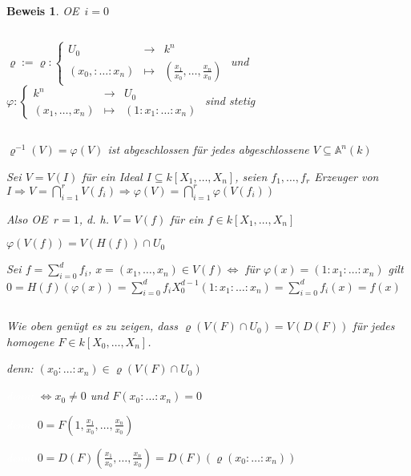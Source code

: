 \documentclass[a4paper, 12pt, numbers=noendperiod, chapterprefix=true]{scrbook}
\theoremstyle{break}
\theoremstyle{nonumberbreak}
\newtheorem{Bew}{Beweis}
\theoremstyle{nonumberplain}
\newcommand{\Sum}{\sum\limits}
\newcommand{\A}{\mathbb{A}}
\renewcommand{\OE}{O\!\!E~}
\begin{document}
\begin{Bew}
\OE $i=0$\begin{description}[\setlabelstyle{\itshape}]
\item[Zeige:]$\ $%

	$\varrho:=\varrho: \left\{\begin{array}{rcl}U_0&\to&k^n\\(x_0,:\ldots :x_n)&\mapsto&(\frac{x_1}{x_0},\ldots ,\frac{x_n}{x_0})\end{array}\right.$ und $\varphi: \left\{\begin{array}{rcl}k^n&\to&U_0\\(x_1,\ldots ,x_n)&\mapsto&(1:x_1:\ldots :x_n)\end{array}\right.$ sind stetig

\item[$\varrho$ stetig:]$\ $
	\begin{description}[\setlabelstyle{\itshape}]
	\item[Zeige:] $\varrho^{-1}(V)=\varphi(V)$ ist abgeschlossen f\"ur jedes abgeschlossene $V\subseteq\A^n(k)$
	\end{description}
	Sei $V=V(I)$ f\"ur ein Ideal $I\subseteq k[X_1,\ldots ,X_n]$, seien $f_1,\ldots ,f_r$ Erzeuger von $I \Rightarrow V=\bigcap\limits_{i=1}^rV(f_i)\Rightarrow \varphi(V)=\bigcap\limits_{i=1}^r\varphi(V(f_i))$
	
	Also \OE $r=1$, d. h. $V=V(f)$ f\"ur ein $f\in k[X_1,\ldots ,X_n]$
	
	\begin{description}[\setlabelstyle{\itshape}]
	\item[Behauptung:] $\varphi(V(f))=V(H(f))\cap U_0$
	\item[denn:] Sei $f=\Sum_{i=0}^df_i$, $x=(x_1,\ldots ,x_n)\in V(f)\Leftrightarrow$ f\"ur $\varphi(x)=(1:x_1:\ldots:x_n)$ gilt $0=H(f)(\varphi(x))=\Sum_{i=0}^df_iX_0^{d-1}(1:x_1:\ldots :x_n)=\Sum_{i=0}^df_i(x)=f(x)$
	\end{description}

\item[$\varphi$ stetig:]$\ $

	Wie oben gen\"ugt es zu zeigen, dass $\varrho(V(F)\cap U_0)=V(D(F))$ f\"ur jedes homogene $F\in k[X_0,\ldots ,X_n]$.
	
	\emph{denn:} $(x_0:\ldots :x_n)\in \varrho(V(F)\cap U_0)$
	
	\textcolor{white}{\emph{denn:}} $\Leftrightarrow x_0\not=0$ und $F(x_0:\ldots :x_n)=0$
	
	\textcolor{white}{\emph{denn:}} $0=F(1,\frac{x_1}{x_0},\ldots ,\frac{x_n}{x_0})$
	
	\textcolor{white}{\emph{denn:}} $0=D(F)(\frac{x_1}{x_0},\ldots ,\frac{x_n}{x_0})= D(F)(\varrho(x_0:\ldots :x_n))$
\end{description}\end{Bew}
\end{document}
